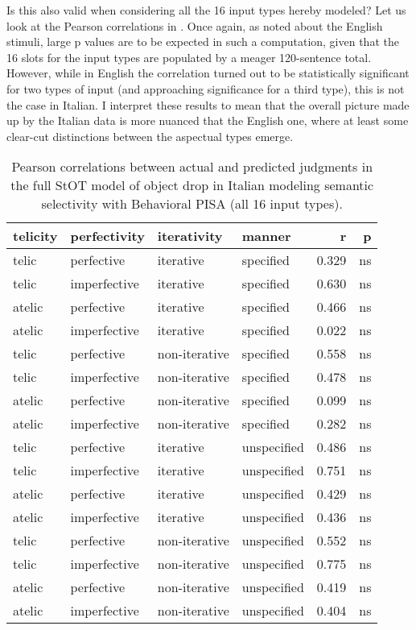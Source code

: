 Is this also valid when considering all the 16 input types hereby modeled? Let us look at the Pearson correlations in . Once again, as noted about the English stimuli, large p values are to be expected in such a computation, given that the 16 slots for the input types are populated by a meager 120-sentence total. However, while in English the correlation turned out to be statistically significant for two types of input (and approaching significance for a third type), this is not the case in Italian. I interpret these results to mean that the overall picture made up by the Italian data is more nuanced that the English one, where at least some clear-cut distinctions between the aspectual types emerge.

\begin{table}[htb] %
\caption{Pearson correlations between actual and predicted judgments in the full StOT model of object drop in Italian modeling semantic selectivity with Behavioral PISA (all 16 input types).}
\begin{tabular}{llll|rr}
\textbf{telicity} & \textbf{perfectivity} & \textbf{iterativity} & \textbf{manner} & \textbf{r} & \textbf{p} \\
\hline
telic    & perfective   & iterative     & specified             & 0.329 & ns \\
telic    & imperfective       & iterative     & specified       & 0.630 & ns \\
atelic   & perfective   & iterative     & specified             & 0.466 & ns \\
atelic   & imperfective       & iterative     & specified       & 0.022 & ns \\
telic    & perfective   & non-iterative & specified             & 0.558 & ns \\
telic    & imperfective       & non-iterative & specified       & 0.478 & ns \\
atelic   & perfective   & non-iterative & specified             & 0.099 & ns \\
atelic   & imperfective       & non-iterative & specified       & 0.282 & ns \\
telic    & perfective   & iterative     & unspecified           & 0.486 & ns \\
telic    & imperfective      & iterative     & unspecified      & 0.751 & ns \\
atelic   & perfective   & iterative     & unspecified           & 0.429 & ns \\
atelic   & imperfective       & iterative     & unspecified     & 0.436 & ns \\
telic    & perfective   & non-iterative & unspecified           & 0.552 & ns \\
telic    & imperfective       & non-iterative & unspecified     & 0.775 & ns \\
atelic   & perfective         & non-iterative & unspecified     & 0.419 & ns \\
atelic   & imperfective   & non-iterative & unspecified         & 0.404 & ns
\end{tabular}
\end{table}

